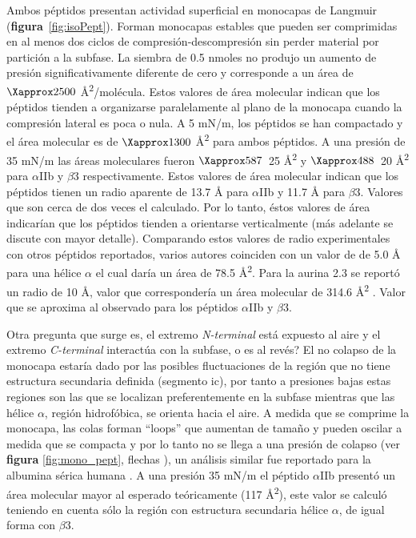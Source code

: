 Ambos péptidos presentan actividad superficial en monocapas de Langmuir (\textbf{figura}~\ref{fig:isoPept}). Forman monocapas estables que pueden ser comprimidas en al menos dos ciclos de compresión-descompresión sin perder material por partición a la subfase. La siembra de 0.5 nmoles no produjo un aumento de presión significativamente diferente de cero y corresponde a un área de $\Xapprox 2500$ Å\textsuperscript{2}/molécula. Estos valores de área molecular indican que los péptidos tienden a organizarse paralelamente al plano de la monocapa cuando la compresión lateral es poca o nula. A 5 mN/m, los péptidos se han compactado y el área molecular es de  $\Xapprox 1300$ Å\textsuperscript{2} para ambos péptidos. A una presión de 35 mN/m las áreas moleculares fueron $\Xapprox 587$ \textpm \,25 Å\textsuperscript{2} y $\Xapprox 488$ \textpm \,20 Å\textsuperscript{2} para $\alpha$IIb y $\beta$3 respectivamente. Estos valores de área molecular indican que los péptidos tienen un radio aparente de 13.7 Å para $\alpha$IIb y 11.7 Å para $\beta$3. Valores que son cerca de dos veces el calculado. Por lo tanto, éstos valores de área indicarían que los péptidos tienden a orientarse verticalmente (más adelante se discute con mayor detalle). Comparando estos valores de radio experimentales con otros péptidos reportados, varios autores coinciden con un valor de de 5.0 Å para una hélice $\alpha$ \citep{Barlow1988, Kato2015,Ionov2000,Weder2003} el cual daría un área de 78.5 Å\textsuperscript{2}. Para la aurina 2.3 se reportó un radio de 10 Å, valor que correspondería un área molecular de 314.6 Å\textsuperscript{2} \citep{Mura2013}. Valor que se aproxima al observado para los péptidos $\alpha$IIb y $\beta$3.

Otra pregunta que surge es, \textquestiondown el extremo \textit{N-terminal} está expuesto al aire y el extremo \textit{C-terminal} interactúa con la subfase, o es al revés? El no colapso de la monocapa estaría dado por las posibles fluctuaciones de la región que no tiene estructura secundaria definida (segmento \ac{ic}), por tanto a presiones bajas estas regiones son las que se localizan preferentemente en la subfase mientras que las  hélice $\alpha$, región hidrofóbica, se orienta hacia el aire. A medida que se comprime la monocapa, las colas forman ``loops'' que aumentan de tamaño y pueden oscilar a medida que se compacta y por lo tanto no se llega a una presión de colapso (ver \textbf{figura} \ref{fig:mono_pept}, flechas \textcolor{blue}{\faLongArrowRight}), un análisis similar fue reportado para la albumina sérica humana \citep{Toimil2012}. A una presión 35 mN/m el péptido $\alpha$IIb presentó un área molecular mayor al esperado teóricamente (117 Å\textsuperscript{2}), este valor se calculó teniendo en cuenta sólo la región con estructura secundaria hélice $\alpha$, de igual forma con $\beta$3.

